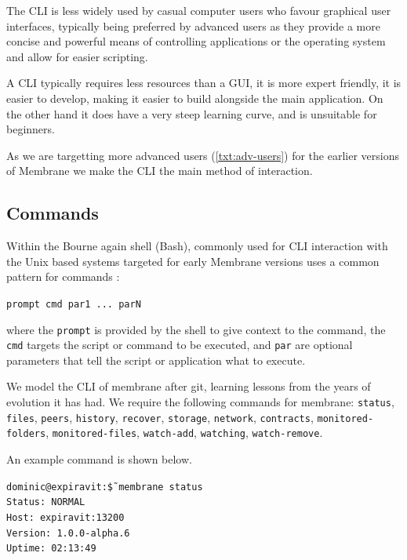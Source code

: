 \documentclass[11pt, a4paper, twoside]{report}
\def\code#1{\texttt{#1}}
\begin{document}
The CLI is less widely used by casual computer users who favour graphical user interfaces, typically being preferred by advanced users as they provide a more concise and powerful means of controlling applications or the operating system and allow for easier scripting.

A CLI typically requires less resources than a GUI, it is more expert friendly, it is easier to develop, making it easier to build alongside the main application. On the other hand it does have a very steep learning curve, and is unsuitable for beginners.

As we are targetting more advanced users (\ref{txt:adv-users}) for the earlier versions of Membrane we make the CLI the main method of interaction.

\subsection{Commands}

Within the Bourne again shell (Bash), commonly used for CLI interaction with the Unix based systems targeted for early Membrane versions uses a common pattern for commands \citep{gnu2016man}:

\begin{displayquote}
 \code{prompt cmd par1 ... parN}
\end{displayquote}

where the \code{prompt} is provided by the shell to give context to the command, the \code{cmd} targets the script or command to be executed, and \code{par} are optional parameters that tell the script or application what to execute.

We model the CLI of membrane after git, learning lessons from the years of evolution it has had. We require the following commands for membrane: \code{status}, \code{files}, \code{peers}, \code{history}, \code{recover}, \code{storage}, \code{network}, \code{contracts}, \code{monitored-folders}, \code{monitored-files}, \code{watch-add}, \code{watching}, \code{watch-remove}.

An example command is shown below.

\begin{displayquote}
 \scriptsize
 \code{dominic@expiravit:\~\$ membrane status} \\
 \code{Status:         NORMAL} \\
 \code{Host:           expiravit:13200} \\
 \code{Version:        1.0.0-alpha.6} \\
 \code{Uptime:         02:13:49}
\end{displayquote}
\end{document}
